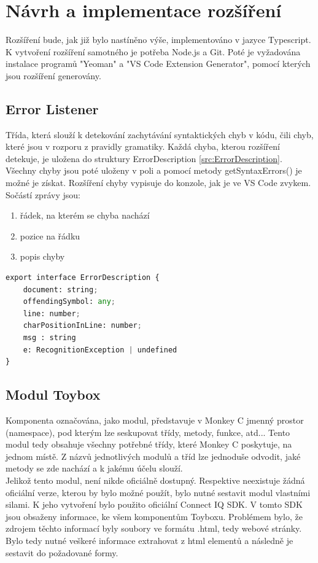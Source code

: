 \chapter{Návrh a implementace rozšíření}
Rozšíření bude, jak již bylo nastíněno výše, implementováno v jazyce Typescript. K vytvoření rozšíření samotného je potřeba Node.js a Git. Poté je vyžadována instalace programů "Yeoman" a "VS Code Extension Generator", pomocí kterých jsou rozšíření generovány.\\

\section{Error Listener}
Třída, která slouží k detekování zachytávání syntaktických chyb v kódu, čili chyb, které jsou v rozporu z pravidly gramatiky. Každá chyba, kterou rozšíření detekuje, je uložena do struktury ErrorDescription \ref{src:ErrorDescription}. Všechny chyby jsou poté uloženy v poli a pomocí metody getSyntaxErrors() je možné je získat. Rozšíření chyby vypisuje do konzole, jak je ve VS Code zvykem. Sočástí zprávy jsou:
\begin{enumerate}
\item řádek, na kterém se chyba nachází
\item pozice na řádku
\item popis chyby
\end{enumerate}

\begin{lstlisting}[language=Python,label=src:ErrorDescription,caption={rozhraní pro popis chyby}]
export interface ErrorDescription {
	document: string;
	offendingSymbol: any;
	line: number;
	charPositionInLine: number;
	msg : string
	e: RecognitionException | undefined
}
\end{lstlisting}

\section{Modul Toybox}
Komponenta označována, jako modul, představuje v Monkey C jmenný prostor (namespace), pod kterým lze seskupovat třídy, metody, funkce, atd... 
Tento modul tedy obsahuje všechny potřebné třídy, které Monkey C poskytuje, na jednom místě. Z názvů jednotlivých modulů a tříd lze jednoduše odvodit, jaké metody se zde nachází a k jakému účelu slouží.\\ 
Jelikož tento modul, není nikde oficiálně dostupný. Respektive neexistuje žádná oficiální verze, kterou by bylo možné použít, bylo nutné sestavit modul vlastními silami. K jeho vytvoření bylo použito oficiální Connect IQ SDK. V tomto SDK jsou obsaženy informace, ke všem komponentům Toyboxu. Problémem bylo, že zdrojem těchto informací byly soubory ve formátu .html, tedy webové stránky. Bylo tedy nutné veškeré informace extrahovat z html elementů a následně je sestavit do požadované formy.

